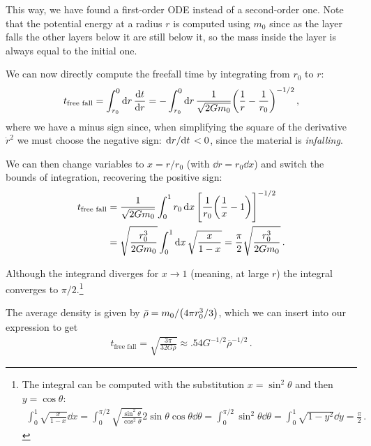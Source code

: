 \documentclass[main.tex]{subfiles}
\begin{document}
This way, we have found a first-order ODE instead of a second-order one.
Note that the potential energy at a radius \(r\) is computed using \(m_0 \) since as the layer falls the other layers below it are still below it, so the mass inside the layer is always equal to the initial one.

We can now directly compute the freefall time by integrating from \(r_0 \) to \(r\):
%
\begin{align}
  t _{\text{free fall}} =  \int_{r_0 }^{0} \dd{r} \dv{t}{r}
  = - \int_{r_0 }^{0} \dd{r} \frac{1}{\sqrt{2Gm_0 }}\qty(\frac{1}{r} - \frac{1}{r_0 })^{-1/2}
\,,
\end{align}
%
where we have a minus sign since, when simplifying the square of the derivative \(\dot{r}^2\) we must choose the negative sign: \(\dv*{r}{t}<0\), since the material is \emph{infalling}.

We can then change variables to \(x = r / r_0 \) (with \(\dd{r} = r_0 \dd{x}\)) and switch the bounds of integration, recovering the positive sign:
%
\begin{align}
  t _{\text{free fall}}
  &=  \frac{1}{ \sqrt{2Gm_0 }} \int_{0}^{1} r_0 \dd{x} \qty[ \frac{1}{r_0 } \qty( \frac{1}{x} - 1)]^{-1/2}  \\
  &= \sqrt{\frac{r_0^3}{2 G m_0 }} \int_{0}^{1} \dd{x} \sqrt{\frac{x}{1-x}}
  = \frac{\pi}{2} \sqrt{\frac{r_0^3}{2 G m_0 }}
\,.
\end{align}

Although the integrand diverges for \(x \to 1\) (meaning, at large \(r\)) the integral converges to \(\pi /2\).\footnote{The integral can be computed with the substitution \(x = \sin^2 \theta \) and then \(y = \cos \theta \): 
%
\begin{align}
\int_{0}^{1} \sqrt{ \frac{x}{1-x}} \dd{x} = \int_{0}^{\pi / 2} \sqrt{ \frac{\sin^2\theta}{\cos^2 \theta }} 2 \sin \theta \cos \theta \dd{\theta } = \int_{0}^{\pi /2} \sin^2\theta \dd{\theta } = \int_{0}^{1} \sqrt{1 - y^2} \dd{y} = \frac{\pi}{2}
\,.
\end{align}}

The average density is given by \(\bar{\rho} = m_0 / \qty(4 \pi r_0^3 / 3)\), which we can insert into our expression to get 
%
\begin{align}
  t _{\text{free fall}} = \sqrt{\frac{3 \pi }{32 G \bar{\rho} }} \approx \num{.54} G^{-1/2} \overline{\rho}^{-1/2}
\,.
\end{align}
\end{document}
